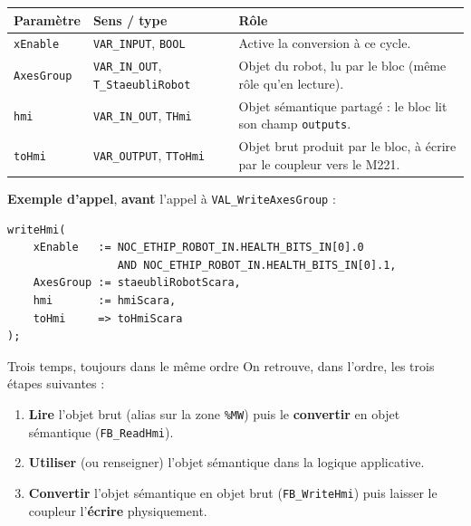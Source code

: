 \begin{center}
\begin{tabular}{|l|l|p{7.3cm}|}
\hline
\textbf{Paramètre} & \textbf{Sens / type} & \textbf{Rôle} \\
\hline
\texttt{xEnable} & \texttt{VAR\_INPUT}, \texttt{BOOL} & Active la
conversion à ce cycle. \\
\hline
\texttt{AxesGroup} & \texttt{VAR\_IN\_OUT}, \texttt{T\_StaeubliRobot} &
Objet du robot, lu par le bloc (même rôle qu'en lecture). \\
\hline
\texttt{hmi} & \texttt{VAR\_IN\_OUT}, \texttt{THmi} & Objet sémantique
partagé : le bloc lit son champ \texttt{outputs}. \\
\hline
\texttt{toHmi} & \texttt{VAR\_OUTPUT}, \texttt{TToHmi} & Objet brut
produit par le bloc, à écrire par le coupleur vers le M221. \\
\hline
\end{tabular}
\end{center}

\textbf{Exemple d'appel}, \textbf{avant} l'appel à
\texttt{VAL\_WriteAxesGroup} :

\begin{lstlisting}
writeHmi(
    xEnable   := NOC_ETHIP_ROBOT_IN.HEALTH_BITS_IN[0].0
                 AND NOC_ETHIP_ROBOT_IN.HEALTH_BITS_IN[0].1,
    AxesGroup := staeubliRobotScara,
    hmi       := hmiScara,
    toHmi     => toHmiScara
);
\end{lstlisting}

\begin{UPSTIidee}{Trois temps, toujours dans le même ordre}
On retrouve, dans l'ordre, les trois étapes suivantes :
\begin{enumerate}
    \item \textbf{Lire} l'objet brut (alias sur la zone \texttt{\%MW})
    puis le \textbf{convertir} en objet sémantique (\texttt{FB\_ReadHmi}).
    \item \textbf{Utiliser} (ou renseigner) l'objet sémantique dans la
    logique applicative.
    \item \textbf{Convertir} l'objet sémantique en objet brut
    (\texttt{FB\_WriteHmi}) puis laisser le coupleur l'\textbf{écrire}
    physiquement.
\end{enumerate}
\end{UPSTIidee}

